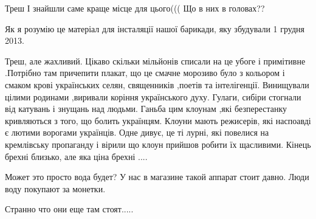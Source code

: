 \begin{itemize}
 
Треш
І знайшли саме краще місце для цього(((
Що в них в головах??

 
Як я розумію це матеріал для інсталяції нашої барикади, яку збудували 1 грудня 2013.

 

Треш, але жахливий. Цікаво скільки мільйонів списали на це убоге і примітивне
.Потрібно там причепити плакат, що це смачне морозиво було з кольором і смаком
крові українських селян, священників ,поетів та інтелігенції. Винищували цілими
родинами ,виривали коріння українського духу. Гулаги, сибіри стогнали від
катувань і знущань над людьми. Ганьба цим клоунам ,які безперестанку кривляються
з того, що болить українцям. Клоуни мають режисерів, які наспоавді є лютими
ворогами українців. Одне дивує, це ті лурні, які повелися на кремлівську
пропаганду і вірили що клоун прийшов робити їх щасливими. Кінець брехні
близько, але яка ціна брехні ....


 
Может это просто вода будет? У нас в магазине такой аппарат стоит давно. Люди воду покупают за монетки.

 
Странно что они еще там стоят.....


\end{itemize}
